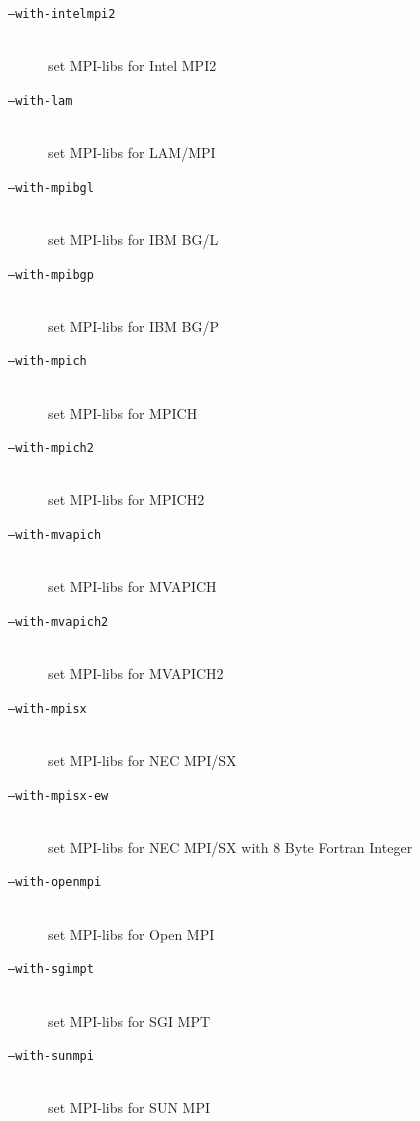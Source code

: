 \documentclass[a4paper,twoside,12pt,BCOR12mm]{scrbook}
\begin{document}
\begin{latexonly}
\begin{description}
\item[\texttt{--with-intelmpi2}] ~\\
                              set MPI-libs for Intel MPI2

\item[\texttt{--with-lam}] ~\\
                              set MPI-libs for LAM/MPI

\item[\texttt{--with-mpibgl}] ~\\
                              set MPI-libs for IBM BG/L

\item[\texttt{--with-mpibgp}] ~\\
                              set MPI-libs for IBM BG/P

\item[\texttt{--with-mpich}] ~\\
                              set MPI-libs for MPICH

\item[\texttt{--with-mpich2}] ~\\
                              set MPI-libs for MPICH2

\item[\texttt{--with-mvapich}] ~\\
                              set MPI-libs for MVAPICH

\item[\texttt{--with-mvapich2}] ~\\
                              set MPI-libs for MVAPICH2

\item[\texttt{--with-mpisx}] ~\\
                              set MPI-libs for NEC MPI/SX

\item[\texttt{--with-mpisx-ew}] ~\\
                              set MPI-libs for NEC MPI/SX with 8 Byte Fortran Integer

\item[\texttt{--with-openmpi}] ~\\
                              set MPI-libs for Open MPI

\item[\texttt{--with-sgimpt}] ~\\
                              set MPI-libs for SGI MPT

\item[\texttt{--with-sunmpi}] ~\\
                              set MPI-libs for SUN MPI


\end{description}
\end{latexonly}
\end{document}
